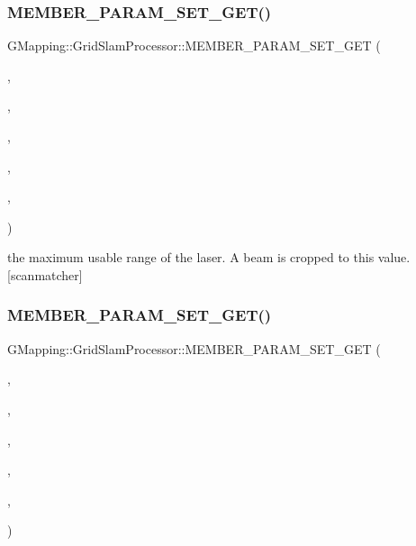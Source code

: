 \subsubsection{\texorpdfstring{M\+E\+M\+B\+E\+R\+\_\+\+P\+A\+R\+A\+M\+\_\+\+S\+E\+T\+\_\+\+G\+E\+T()}{MEMBER\_PARAM\_SET\_GET()}\hspace{0.1cm}{\footnotesize\ttfamily [2/16]}}
{\footnotesize\ttfamily G\+Mapping\+::\+Grid\+Slam\+Processor\+::\+M\+E\+M\+B\+E\+R\+\_\+\+P\+A\+R\+A\+M\+\_\+\+S\+E\+T\+\_\+\+G\+ET (\begin{DoxyParamCaption}\item[{\hyperlink{classGMapping_1_1GridSlamProcessor_ac50952d259590c4aeba22eee4e6437f5}{m\+\_\+matcher}}]{,  }\item[{double}]{,  }\item[{usable\+Range}]{,  }\item[{protected}]{,  }\item[{public}]{,  }\item[{public}]{ }\end{DoxyParamCaption})}

the maximum usable range of the laser. A beam is cropped to this value. \mbox{[}scanmatcher\mbox{]} \mbox{\label{classGMapping_1_1GridSlamProcessor_a1a4b79434cb2b998ebeecdf84bec85c5}} 
\subsubsection{\texorpdfstring{M\+E\+M\+B\+E\+R\+\_\+\+P\+A\+R\+A\+M\+\_\+\+S\+E\+T\+\_\+\+G\+E\+T()}{MEMBER\_PARAM\_SET\_GET()}\hspace{0.1cm}{\footnotesize\ttfamily [3/16]}}
{\footnotesize\ttfamily G\+Mapping\+::\+Grid\+Slam\+Processor\+::\+M\+E\+M\+B\+E\+R\+\_\+\+P\+A\+R\+A\+M\+\_\+\+S\+E\+T\+\_\+\+G\+ET (\begin{DoxyParamCaption}\item[{\hyperlink{classGMapping_1_1GridSlamProcessor_ac50952d259590c4aeba22eee4e6437f5}{m\+\_\+matcher}}]{,  }\item[{double}]{,  }\item[{gaussian\+Sigma}]{,  }\item[{protected}]{,  }\item[{public}]{,  }\item[{public}]{ }\end{DoxyParamCaption})}

